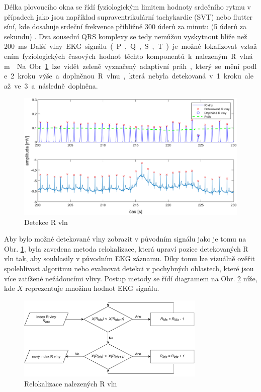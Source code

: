 Délka plovoucího okna se řídí fyziologickým limitem hodnoty srdečního rytmu v
případech jako jsou například supraventrikulární tachykardie (SVT) nebo flutter
síní, kde dosahuje srdeční frekvence přibližně 300 úderů za minutu (5 úderů za
sekundu) \cite{Haberl2012,Goldberger2017}. Dva sousední QRS komplexy se tedy
nemůžou vyskytnout blíže než 200~\si\ms.

Další vlny EKG signálu (P, Q, S, T) je možné lokalizovat vztažením
fyziologických časových hodnot těchto komponentů k nalezeným R vlnám
\cite{Nabian2018}. Na Obr. \ref{fig:detection} lze vidět zeleně vyznačený
adaptivní práh, který se mění podle 2. kroku výše a doplněnou R vlnu, která
nebyla detekovaná v 1. kroku ale až ve 3. a následně doplněna.

\begin{figure}[h]
    \begin{center}
        \includegraphics[width=1\textwidth]{../assets/figures/detection}
        \caption{Detekce R vln}
        \label{fig:detection}
    \end{center}
\end{figure}

Aby bylo možné detekované vlny zobrazit v původním signálu jako je tomu na Obr.
\ref{fig:detection}, byla zavedena metoda relokalizace, která upraví pozice
detekovaných R vln tak, aby souhlasily v původním EKG záznamu. Díky tomu lze
vizuálně ověřit spolehlivost algoritmu nebo evaluovat detekci v pochybných
oblastech, které jsou více zatížené nežádoucími vlivy. Postup metody se řídí
diagramem na Obr. \ref{fig:fixpeaks} níže, kde $X$ reprezentuje množinu hodnot
EKG signálu.

\begin{figure}[h]
    \begin{center}
        \includegraphics[width=0.8\textwidth]{../assets/diagrams/fixpeaks}
        \caption{Relokalizace nalezených R vln}
        \label{fig:fixpeaks}
    \end{center}
\end{figure}

